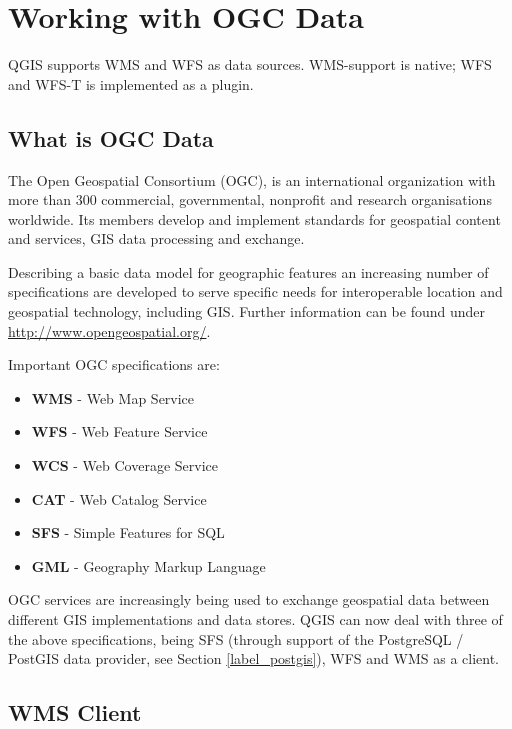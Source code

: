 \chapter{Working with OGC Data}\label{working_with_ogc}

\updatedisclaimer

QGIS supports WMS and WFS as data sources. WMS-support is native; WFS and WFS-T is
implemented as a plugin.

\section{What is OGC Data}

The Open Geospatial Consortium (OGC), is an international organization with more than 300
commercial, governmental, nonprofit and research organisations worldwide. Its members
develop and implement standards for geospatial content and services, GIS data processing
and exchange.

Describing a basic data model for geographic features an increasing number of specifications
are developed to serve specific needs for interoperable location and geospatial technology,
including GIS. Further information can be found under \url{http://www.opengeospatial.org/}.

Important OGC specifications are:

\begin{itemize}[label=--]
\item \textbf{WMS} - Web Map Service
\item \textbf{WFS} - Web Feature Service
\item \textbf{WCS} - Web Coverage Service
\item \textbf{CAT} - Web Catalog Service
\item \textbf{SFS} - Simple Features for SQL
\item \textbf{GML} - Geography Markup Language
\end{itemize}

OGC services are increasingly being used to exchange geospatial data between
different GIS implementations and data stores.  QGIS can now deal with three of the
above specifications, being SFS (through support of the PostgreSQL / PostGIS
data provider, see Section \ref{label_postgis}), WFS and WMS as a client.

\section{WMS Client}\label{sec:ogc-wms}

